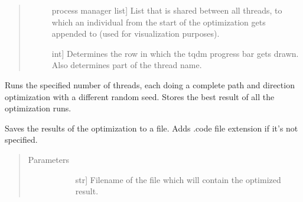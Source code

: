 \documentclass[letterpaper,10pt,english,openany,oneside]{sphinxmanual}
\begin{document}
\begin{fulllineitems}
\begin{fulllineitems}
\begin{quote}
\begin{description}
\begin{description}
\item[{}] \leavevmode{[}process manager list{]}
List that is shared between all threads, to which an individual
from the start of the optimization gets appended to (used for
visualization purposes).

\item[{}] \leavevmode{[}int{]}
Determines the row in which the tqdm progress bar gets drawn. Also
determines part of the thread name.

\end{description}

\end{description}\end{quote}

\end{fulllineitems}


\begin{fulllineitems}
\label{\detokenize{reference:cnc.optimization.CNCOptimizer.optimize}}
Runs the specified number of threads, each doing a complete path and
direction optimization with a different random seed. Stores the best
result of all the optimization runs.

\end{fulllineitems}


\begin{fulllineitems}
\label{\detokenize{reference:cnc.optimization.CNCOptimizer.save}}
Saves the results of the optimization to a file. Adds .code file
extension if it’s not specified.
\begin{quote}\begin{description}
\item[{Parameters}] \leavevmode\begin{description}
\item[{}] \leavevmode{[}str{]}
Filename of the file which will contain the optimized result.

\end{description}


\end{description}
\end{quote}
\end{fulllineitems}
\end{fulllineitems}
\end{document}
